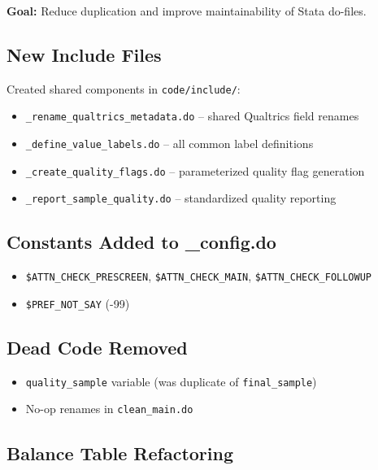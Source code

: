     

\textbf{Goal:} Reduce duplication and improve maintainability of Stata do-files.

\subsection{New Include Files}

Created shared components in \texttt{code/include/}:
\begin{itemize}
    \item \texttt{\_rename\_qualtrics\_metadata.do} -- shared Qualtrics field renames
    \item \texttt{\_define\_value\_labels.do} -- all common label definitions
    \item \texttt{\_create\_quality\_flags.do} -- parameterized quality flag generation
    \item \texttt{\_report\_sample\_quality.do} -- standardized quality reporting
\end{itemize}

\subsection{Constants Added to \_config.do}

\begin{itemize}
    \item \texttt{\$ATTN\_CHECK\_PRESCREEN}, \texttt{\$ATTN\_CHECK\_MAIN}, \texttt{\$ATTN\_CHECK\_FOLLOWUP}
    \item \texttt{\$PREF\_NOT\_SAY} (-99)
\end{itemize}

\subsection{Dead Code Removed}

\begin{itemize}
    \item \texttt{quality\_sample} variable (was duplicate of \texttt{final\_sample})
    \item No-op renames in \texttt{clean\_main.do}
\end{itemize}

\subsection{Balance Table Refactoring}

